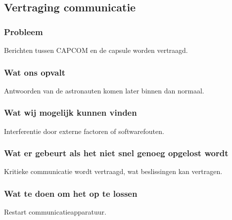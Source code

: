 \subsection{Vertraging communicatie}

\subsubsection{Probleem}
Berichten tussen CAPCOM en de capsule worden vertraagd.

\subsubsection{Wat ons opvalt}
Antwoorden van de astronauten komen later binnen dan normaal.

\subsubsection{Wat wij mogelijk kunnen vinden}
Interferentie door externe factoren of softwarefouten.

\subsubsection{Wat er gebeurt als het niet snel genoeg opgelost wordt}
Kritieke communicatie wordt vertraagd, wat beslissingen kan vertragen.

\subsubsection{Wat te doen om het op te lossen}
Restart communicatieapparatuur.